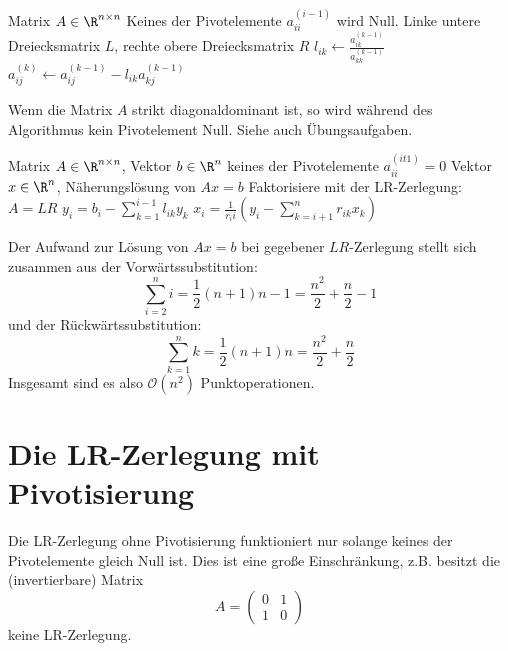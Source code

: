 \documentclass{mycourse}
\begin{document}
\begin{alg}[LR-Zerlegung]
\label{alg:3.5}
\begin{algorithmic}
	\Input Matrix $A\in \R^{n\times n}$
	\Assert Keines der Pivotelemente $a_{ii}^{(i-1)}$ wird Null.
	\Output Linke untere Dreiecksmatrix $L$, rechte obere Dreiecksmatrix $R$
	\Statex
			\State $l_{ik} \gets \frac{a_{ik}^{(k-1)}}{a_{kk}^{(k-1)}}$
		\EndFor
			\State $a_{ij}^{(k)} \gets a_{ij}^{(k-1)} - l_{ik} a_{kj}^{(k-1)}$
		\EndFor
	\EndFor
\end{algorithmic}

\begin{note}
	Wenn die Matrix $A$ strikt diagonaldominant ist, so wird während des Algorithmus kein Pivotelement Null.
	Siehe auch Übungsaufgaben.
\end{note}
\end{alg}


\begin{alg}[Gaußalgorithmus]
	\label{3.6}
	\begin{algorithmic}
		\Input Matrix $A\in \R^{n\times n}$, Vektor $b\in \R^n$
		\Assume keines der Pivotelemente $a_{ii}^{(it1)}=0$
		\Output Vektor $x\in \R^n$, Näherungslösung von $Ax=b$
		\Statex
		\State Faktorisiere mit der LR-Zerlegung: $A =LR$
			\State $\displaystyle y_i = b_i - \sum_{k=1}^{i-1} l_{ik}y_k$
		\EndFor
			\State $\displaystyle x_i = \frac 1{r_ii} \left(y_i -\sum_{k=i+1}^n r_{ik} x_k\right)$
		\EndFor
	\end{algorithmic}

	Der Aufwand zur Lösung von $Ax=b$ bei gegebener $LR$-Zerlegung stellt sich zusammen aus der Vorwärtssubstitution:
	\[
	\sum_{i=2}^ni = \frac 12 (n+1)n-1 = \frac {n^2}2 +\frac n2 -1
	\]
	und der Rückwärtssubstitution:
	\[
	\sum_{k=1}^nk = \frac 12 (n+1)n = \frac {n^2}2 +\frac n2
	\]
	Insgesamt sind es also $\mathcal O(n^2)$ Punktoperationen.
\end{alg}

\section{Die LR-Zerlegung mit Pivotisierung}

Die LR-Zerlegung ohne Pivotisierung funktioniert nur solange keines der Pivotelemente gleich Null ist.
Dies ist eine große Einschränkung, z.B. besitzt die (invertierbare) Matrix
\[
A=\begin{pmatrix}0&1\\1&0\end{pmatrix}
\]
keine LR-Zerlegung.
\end{document}
